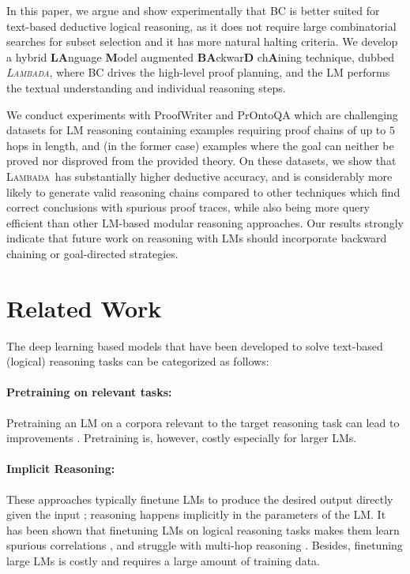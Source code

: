 \documentclass[11pt]{article}
\newcommand{\algo}{\textsc{Lambada}}
\begin{document}
In this paper, we argue and show experimentally that BC is better suited for text-based deductive logical reasoning, as it does not require large combinatorial searches for subset selection and it has more natural halting criteria. We develop a hybrid \textbf{LA}nguage \textbf{M}odel augmented \textbf{BA}ckwar\textbf{D} ch\textbf{A}ining technique, dubbed \emph{\algo}, where BC drives the high-level proof planning, and the LM performs the textual understanding and individual reasoning steps.

We conduct experiments with ProofWriter \cite{tafjord2020proofwriter} and PrOntoQA \cite{saparov2022language} which are challenging datasets for LM reasoning containing examples requiring proof chains of up to $5$ hops in length, and (in the former case) examples where the goal can neither be proved nor disproved from the provided theory. On these datasets, we show that \algo\ has substantially higher deductive accuracy, and is considerably more likely to generate valid reasoning chains compared to other techniques which find correct conclusions with spurious proof traces, while also being more query efficient than other LM-based modular reasoning approaches. Our results strongly indicate that future work on reasoning with LMs should incorporate backward chaining or goal-directed strategies.

\section{Related Work}
The deep learning based models that have been developed to solve text-based (logical) reasoning tasks can be categorized as follows:

\paragraph{Pretraining on relevant tasks:} Pretraining an LM on a corpora relevant to the target reasoning task can lead to improvements \cite{hendrycks2021measuring,shen2021generate}. Pretraining is, however, costly especially for larger LMs. 
\paragraph{Implicit Reasoning:} These approaches typically finetune LMs to produce the desired output directly given the input \cite{clark2020transformers,betz2020critical,saeed2021rulebert,han2022folio}; reasoning happens implicitly in the parameters of the LM.
It has been shown that finetuning LMs on logical reasoning tasks makes them learn spurious correlations \cite{zhang2022paradox,schlegel2022can}, and struggle with multi-hop reasoning \cite{kassner2020pretrained}. Besides, finetuning large LMs is costly and requires a large amount of training data.
\end{document}
